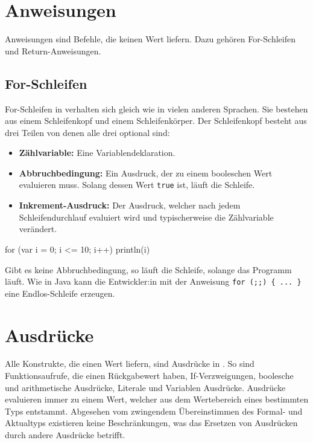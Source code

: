 \section{Anweisungen}

Anweisungen sind Befehle, die keinen Wert liefern. Dazu gehören For-Schleifen und Return-Anweisungen.

\subsection{For-Schleifen}

For-Schleifen in \toya verhalten sich gleich wie in vielen anderen Sprachen. Sie bestehen aus einem Schleifenkopf und einem Schleifenkörper. Der Schleifenkopf besteht aus drei Teilen von denen alle drei optional sind:
\begin{itemize}
    \item \textbf{Zählvariable:} Eine Variablendeklaration.
    \item \textbf{Abbruchbedingung:} Ein Ausdruck, der zu einem booleschen Wert evaluieren muss. Solang dessen Wert \texttt{true} ist, läuft die Schleife.  
    \item \textbf{Inkrement-Ausdruck:} Der Ausdruck, welcher nach jedem Schleifendurchlauf evaluiert wird und typischerweise die Zählvariable verändert.
\end{itemize}

\begin{ToyaCode}[numbers=none, caption={Eine For-Schleife, die die Zählvariable auf die Konsole ausgibt.}]
for (var i = 0; i <= 10; i++) {
    println(i)
}
\end{ToyaCode}

Gibt es keine Abbruchbedingung, so läuft die Schleife, solange das Programm läuft. Wie in Java kann die Entwickler:in mit der Anweisung \texttt{for (;;) \{ ... \}} eine Endlos-Schleife erzeugen.

\section{Ausdrücke}

Alle Konstrukte, die einen Wert liefern, sind Ausdrücke in \toya. So sind Funktionsaufrufe, die einen Rückgabewert haben, If-Verzweigungen, boolesche und arithmetische Ausdrücke, Literale und Variablen Ausdrücke. Ausdrücke evaluieren immer zu einem Wert, welcher aus dem Wertebereich eines bestimmten Typs entstammt. Abgesehen vom zwingendem Übereinstimmen des Formal- und Aktualtyps existieren keine Beschränkungen, was das Ersetzen von Ausdrücken durch andere Ausdrücke betrifft.

